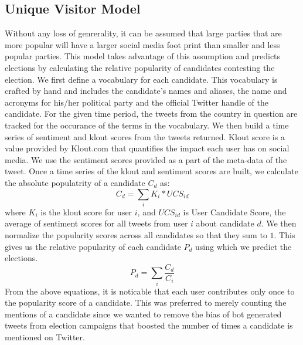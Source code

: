 \subsection{Unique Visitor Model}
Without any loss of genrerality, it can be assumed that large parties that are more popular will have a larger social media foot print than smaller and less popular parties. 
This model takes advantage of this assumption and predicts elections by calculating the relative popularity of candidates contesting the election.
We first define a vocabulary for each candidate. 
This vocabulary is crafted by hand and includes the candidate's names and aliases, the name and acronyms for his/her political party and the official Twitter handle of the candidate.
For the given time period, the tweets from the country in question are tracked for the occurance of the terms in the vocabulary.
We then build a time series of sentiment and klout scores from the tweets returned.
Klout score is a value provided by Klout.com that quantifies the impact each user has on social media. 
We use the sentiment scores provided as a part of the meta-data of the tweet. 
Once a time series of the klout and sentiment scores are built, we calculate the absolute populatrity of a candidate $C_d$ as:
\begin{equation}
{C_d} = \sum_i K_i * UCS_{id}
\end{equation}
where $K_i$ is the klout score for user $i$, and $UCS_{id}$ is User Candidate Score, the average of sentiment scores for all tweets from user $i$ about candidate $d$.
We then normalize the popularity scores across all candidates so that they sum to $1$.
This gives us the relative popularity of each candidate $P_d$ using which we predict the elections.
\begin{equation}
{P_d} = \sum_i \frac{C_d}{C_i}
\end{equation}
From the above equations, it is noticable that each user contributes only once to the popularity score of a candidate.
This was preferred to merely counting the mentions of a candidate since we wanted to remove the bias of bot generated tweets from election campaigns that boosted the number of times a candidate is mentioned on Twitter.

